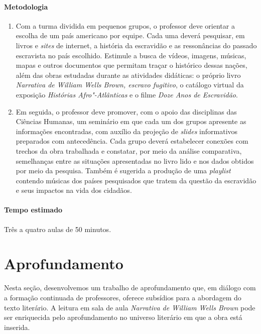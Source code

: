 \documentclass[12pt]{extarticle}
\begin{document}
 \paragraph{Metodologia}
   \begin{enumerate}
    \item
    Com a turma dividida em pequenos grupos, o professor deve orientar
    a escolha de um país americano por equipe. Cada uma deverá pesquisar, em livros e
  \emph{sites} de internet, a história da escravidão e as ressonâncias
  do passado escravista no país escolhido. Estimule a busca de vídeos,
  imagens, músicas, mapas e outros documentos que permitam traçar o
  histórico dessas nações, além das obras estudadas durante as atividades 
  didáticas: o próprio livro \emph{Narrativa de William Wells Brown, escravo fugitivo},
  o catálogo virtual da exposição \emph{Histórias Afro"-Atlânticas} e o filme
  \emph{Doze Anos de Escravidão}.

    \item
    Em seguida, o professor deve promover, com o apoio das disciplinas das Ciências Humanas, um seminário em
  que cada um dos grupos apresente as informações encontradas, com
  auxílio da projeção de \emph{slides} informativos preparados com
  antecedência. Cada grupo deverá estabelecer conexões com trechos da
  obra trabalhada e constatar, por meio da análise comparativa,
  semelhanças entre as situações apresentadas no livro lido e nos dados
  obtidos por meio da pesquisa. Também é sugerida a produção de uma
  \emph{playlist} contendo músicas dos países pesquisados que tratem 
  da questão da escravidão e seus impactos na vida dos cidadãos.

   \end{enumerate}

 \paragraph{Tempo estimado} Três a quatro aulas de 50 minutos.




\section{Aprofundamento}


Nesta seção, desenvolvemos um trabalho de aprofundamento que, em diálogo
com a formação continuada de professores, oferece subsídios para a
abordagem do texto literário. A leitura em sala de aula \emph{Narrativa
de William Wells Brown} pode ser enriquecida pelo aprofundamento no
universo literário em que a obra está inserida.
\end{document}
